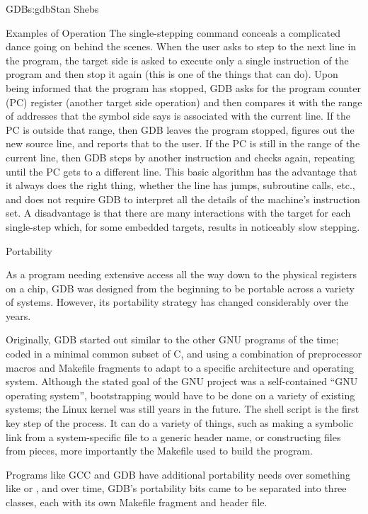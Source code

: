 \begin{aosachapter}{GDB}{s:gdb}{Stan Shebs}
\begin{aosasect1}{Examples of Operation}
The single-stepping command  conceals a complicated dance
going on behind the scenes.  When the user asks to step to the next
line in the program, the target side is asked to execute only a single
instruction of the program and then stop it again (this is one of the
things that  can do).  Upon being informed that the
program has stopped, GDB asks for the program counter (PC) register
(another target side operation) and then compares it with the range of
addresses that the symbol side says is associated with the current
line.  If the PC is outside that range, then GDB leaves the program
stopped, figures out the new source line, and reports that to the
user.  If the PC is still in the range of the current line, then GDB
steps by another instruction and checks again, repeating until the PC
gets to a different line.  This basic algorithm has the advantage that
it always does the right thing, whether the line has jumps, subroutine
calls, etc., and does not require GDB to interpret all the details of
the machine's instruction set.  A disadvantage is that there are many
interactions with the target for each single-step which, for some
embedded targets, results in noticeably slow stepping.

\end{aosasect1}

\begin{aosasect1}{Portability}

As a program needing extensive access all the way down to the physical
registers on a chip, GDB was designed from the beginning to be
portable across a variety of systems.  However, its portability
strategy has changed considerably over the years.

Originally, GDB started out similar to the other GNU programs of the
time; coded in a minimal common subset of C, and using a combination
of preprocessor macros and Makefile fragments to adapt to a specific
architecture and operating system.  Although the stated goal of the
GNU project was a self-contained ``GNU operating system'',
bootstrapping would have to be done on a variety of existing systems;
the Linux kernel was still years in the future.  The 
shell script is the first key step of the process.  It can do a
variety of things, such as making a symbolic link from a
system-specific file to a generic header name, or constructing files
from pieces, more importantly the Makefile used to build the program.

Programs like GCC and GDB have additional portability needs over
something like  or , and over time, GDB's
portability bits came to be separated into three classes, each with
its own Makefile fragment and header file.


\end{aosasect1}
\end{aosachapter}
